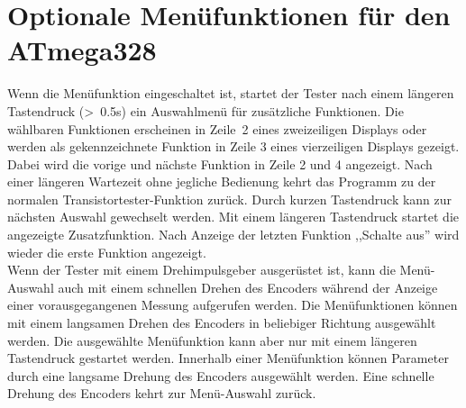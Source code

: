 \section{Optionale Menüfunktionen für den ATmega328}
Wenn die Menüfunktion eingeschaltet ist, startet der Tester nach einem längeren Tastendruck (\textgreater~0.5s) ein Auswahlmenü
für zusätzliche Funktionen.
Die wählbaren Funktionen erscheinen in Zeile~2 eines zweizeiligen Displays oder werden als gekennzeichnete
Funktion in Zeile 3 eines vierzeiligen Displays gezeigt. Dabei wird die vorige und nächste Funktion in Zeile 2 und 4 angezeigt.
Nach einer längeren Wartezeit ohne jegliche Bedienung kehrt das Programm zu der normalen Transistortester-Funktion zurück.
Durch kurzen Tastendruck kann zur nächsten Auswahl gewechselt werden.
Mit einem längeren Tastendruck startet die angezeigte Zusatzfunktion.
Nach Anzeige der letzten Funktion ,,Schalte aus'' wird wieder die erste Funktion angezeigt.\\

Wenn der Tester mit einem Drehimpulsgeber ausgerüstet ist, kann die Menü-Auswahl auch mit einem schnellen
Drehen des Encoders während der Anzeige einer vorausgegangenen Messung aufgerufen werden.
Die Menüfunktionen können mit einem langsamen Drehen des Encoders in beliebiger Richtung ausgewählt werden.
Die ausgewählte Menüfunktion kann aber nur mit einem längeren Tastendruck gestartet werden.
Innerhalb einer Menüfunktion können Parameter durch eine langsame Drehung des Encoders ausgewählt werden.
Eine schnelle Drehung des Encoders kehrt zur Menü-Auswahl zurück.

